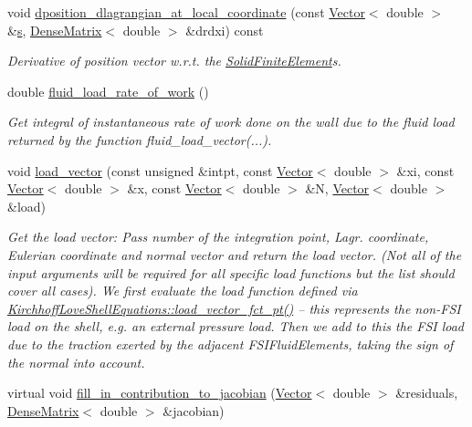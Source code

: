 \begin{DoxyCompactItemize}
void \hyperlink{classoomph_1_1FSIDiagHermiteShellElement_a96062fcb7f6329ceca0635ee5cc4d5f8}{dposition\+\_\+dlagrangian\+\_\+at\+\_\+local\+\_\+coordinate} (const \hyperlink{classoomph_1_1Vector}{Vector}$<$ double $>$ \&\hyperlink{cfortran_8h_ab7123126e4885ef647dd9c6e3807a21c}{s}, \hyperlink{classoomph_1_1DenseMatrix}{Dense\+Matrix}$<$ double $>$ \&drdxi) const
\begin{DoxyCompactList}\small\item\em Derivative of position vector w.\+r.\+t. the \hyperlink{classoomph_1_1SolidFiniteElement}{Solid\+Finite\+Element}\textquotesingle{}s. \end{DoxyCompactList}\item 
double \hyperlink{classoomph_1_1FSIDiagHermiteShellElement_acf4aa46e9dc8969dbb409c761d457fd7}{fluid\+\_\+load\+\_\+rate\+\_\+of\+\_\+work} ()
\begin{DoxyCompactList}\small\item\em Get integral of instantaneous rate of work done on the wall due to the fluid load returned by the function fluid\+\_\+load\+\_\+vector(...). \end{DoxyCompactList}\item 
void \hyperlink{classoomph_1_1FSIDiagHermiteShellElement_a1ef92a7c7157b252fdfc624ab5bc6165}{load\+\_\+vector} (const unsigned \&intpt, const \hyperlink{classoomph_1_1Vector}{Vector}$<$ double $>$ \&xi, const \hyperlink{classoomph_1_1Vector}{Vector}$<$ double $>$ \&x, const \hyperlink{classoomph_1_1Vector}{Vector}$<$ double $>$ \&N, \hyperlink{classoomph_1_1Vector}{Vector}$<$ double $>$ \&load)
\begin{DoxyCompactList}\small\item\em Get the load vector\+: Pass number of the integration point, Lagr. coordinate, Eulerian coordinate and normal vector and return the load vector. (Not all of the input arguments will be required for all specific load functions but the list should cover all cases). We first evaluate the load function defined via \hyperlink{classoomph_1_1KirchhoffLoveShellEquations_a92a3f04077bfcfa5d0a7879003d93801}{Kirchhoff\+Love\+Shell\+Equations\+::load\+\_\+vector\+\_\+fct\+\_\+pt()} -- this represents the non-\/\+F\+SI load on the shell, e.\+g. an external pressure load. Then we add to this the F\+SI load due to the traction exerted by the adjacent F\+S\+I\+Fluid\+Elements, taking the sign of the normal into account. \end{DoxyCompactList}\item 
virtual void \hyperlink{classoomph_1_1FSIDiagHermiteShellElement_a5e48d1c0291cf16cacaa8b42112efe90}{fill\+\_\+in\+\_\+contribution\+\_\+to\+\_\+jacobian} (\hyperlink{classoomph_1_1Vector}{Vector}$<$ double $>$ \&residuals, \hyperlink{classoomph_1_1DenseMatrix}{Dense\+Matrix}$<$ double $>$ \&jacobian)

\end{DoxyCompactItemize}
